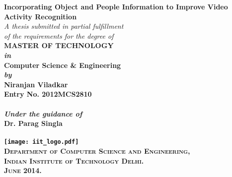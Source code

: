 \begin{titlepage}
\begin{center}

\LARGE{\bfseries Incorporating Object and People Information to Improve Video Activity Recognition}\\
\vspace{20pt}
\normalsize
\emph{A thesis submitted in partial fulfillment} \\
\emph{of the requirements for the degree of} \\
\vspace{20pt}
\bfseries MASTER OF TECHNOLOGY \\
\vspace{20pt}
\emph {in}\\
\vspace{20pt}
\bfseries Computer Science \& Engineering \\
\vspace{20pt}
\emph {by}\\
\vspace{20pt}
\Large{\bfseries Niranjan Viladkar} \\
{\normalsize {\bfseries Entry No. 2012MCS2810}}\\
\ \\
{\normalsize \emph {Under the guidance of}}
\ \\
\Large{\bfseries Dr. Parag Singla} \\
\ \\
\vspace{30pt}
\texttt{[image: iit\_logo.pdf]} \\
\vspace{10pt}
\large{\textsc{Department of Computer Science and Engineering,\\
Indian Institute of Technology Delhi.\\ June 2014.}}
\end{center}
\end{titlepage}
